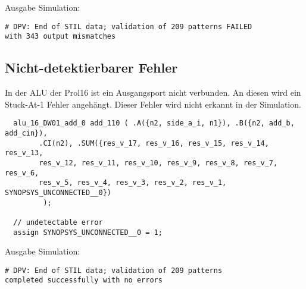 \documentclass[12pt,a4paper]{article}
\begin{document}
Ausgabe Simulation:
\begin{verbatim}
# DPV: End of STIL data; validation of 209 patterns FAILED 
with 343 output mismatches
\end{verbatim}

\subsection{Nicht-detektierbarer Fehler}
In der ALU der Prol16 ist ein Ausgangsport nicht verbunden. An diesen wird ein Stuck-At-1 Fehler angehängt. Dieser Fehler wird nicht erkannt in der Simulation.

\begin{lstlisting}
  alu_16_DW01_add_0 add_110 ( .A({n2, side_a_i, n1}), .B({n2, add_b, add_cin}), 
        .CI(n2), .SUM({res_v_17, res_v_16, res_v_15, res_v_14, res_v_13, 
        res_v_12, res_v_11, res_v_10, res_v_9, res_v_8, res_v_7, res_v_6, 
        res_v_5, res_v_4, res_v_3, res_v_2, res_v_1, SYNOPSYS_UNCONNECTED__0})
         );

  // undetectable error
  assign SYNOPSYS_UNCONNECTED__0 = 1;
\end{lstlisting}

Ausgabe Simulation:
\begin{verbatim}
# DPV: End of STIL data; validation of 209 patterns 
completed successfully with no errors
\end{verbatim}
\end{document}
